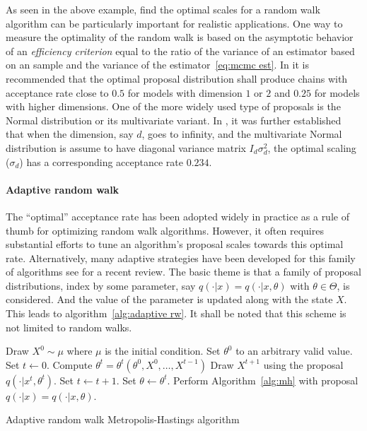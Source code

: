 As seen in the above example, find the optimal scales for a random walk
algorithm can be particularly important for realistic applications. One way to
measure the optimality of the random walk is based on the asymptotic behavior
of an \emph{efficiency criterion} equal to the ratio of the variance of an
estimator based on an \iid sample and the variance of the
estimator~\ref{eq:mcmc est}. In \cite{Roberts:1997dg} it is recommended that
the optimal proposal distribution shall produce chains with acceptance rate
close to $0.5$ for models with dimension $1$ or $2$ and $0.25$ for models with
higher dimensions. One of the more widely used type of proposals is the Normal
distribution or its multivariate variant. In \cite{Roberts:2001ta}, it was
further established that when the dimension, say $d$, goes to infinity, and
the multivariate Normal distribution is assume to have diagonal variance
matrix $I_d\sigma_d^2$, the optimal scaling ($\sigma_d$) has a corresponding
acceptance rate $0.234$.

\paragraph{Adaptive random walk}

The ``optimal'' acceptance rate has been adopted widely in practice as a rule
of thumb for optimizing random walk algorithms. However, it often requires
substantial efforts to tune an algorithm's proposal scales towards this
optimal rate. Alternatively, many adaptive strategies have been developed for
this family of algorithms see \cite{Andrieu:2008kh} for a recent review. The
basic theme is that a family of proposal distributions, index by some
parameter, say $q(\cdot|x) = q(\cdot|x, \theta)$ with $\theta\in\Theta$, is
considered. And the value of the parameter is updated along with the state
$X$. This leads to algorithm~\ref{alg:adaptive rw}. It shall be noted that
this scheme is not limited to random walks.

\begin{algorithm}
\begin{algorithmic}
  \tophrule
  \STATE Draw $X^0\sim\mu$ where $\mu$ is the initial condition.
  \STATE Set $\theta^0$ to an arbitrary valid value.
  \STATE Set $t\leftarrow0$.
  \REPEAT
      \STATE Compute $\theta^t = \theta^t(\theta^0,X^0,\dots,X^{t-1})$
      \STATE Draw $X^{t + 1}$ using the proposal $q(\cdot|x^t,\theta^t)$.
      \STATE Set $t\leftarrow t+1$.
  \STATE Set $\theta\leftarrow\theta^t$.
  \STATE Perform Algorithm~\ref{alg:mh} with proposal $q(\cdot|x) =
  q(\cdot|x,\theta)$.
  \bottomhrule
\end{algorithmic}
\caption{Adaptive random walk Metropolis-Hastings algorithm}
\label{alg:adaptive rw}
\end{algorithm}

